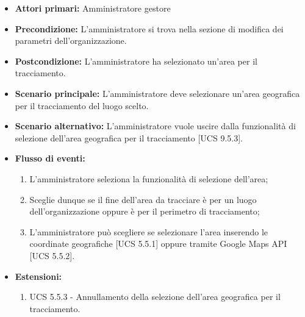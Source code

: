 \begin{itemize}
\item \textbf{Attori primari:} Amministratore gestore
\item \textbf{Precondizione:} L'amministratore si trova nella sezione di modifica dei parametri dell'organizzazione.
\item \textbf{Postcondizione:} L'amministratore ha selezionato un'area per il tracciamento.
\item \textbf{Scenario principale:} L'amministratore deve selezionare un'area geografica per il tracciamento del luogo scelto.
\item \textbf{Scenario alternativo:} L'amministratore vuole uscire dalla funzionalità di selezione dell'area geografica per il tracciamento [UCS 9.5.3].
\item \textbf{Flusso di eventi:}
\begin{enumerate}
    \item L'amministratore seleziona la funzionalità di selezione dell'area;
    \item Sceglie dunque se il fine dell'area da tracciare è per un luogo dell'organizzazione oppure è per il perimetro di tracciamento;
    \item L'amministratore può scegliere se selezionare l'area inserendo le coordinate geografiche [UCS 5.5.1] oppure tramite Google Maps API [UCS 5.5.2].
\end{enumerate}
\item \textbf{Estensioni:}
\begin{enumerate}
    \item UCS 5.5.3 - Annullamento della selezione dell'area geografica per il tracciamento.
\end{enumerate}
\end{itemize}

